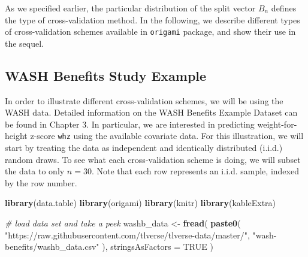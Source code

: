 \documentclass[12pt, krantz2,]{book}
\newenvironment{Shaded}{\begin{snugshade}}{\end{snugshade}}
\newcommand{\CommentTok}[1]{\textcolor[rgb]{0.56,0.35,0.01}{\textit{#1}}}
\newcommand{\DataTypeTok}[1]{\textcolor[rgb]{0.13,0.29,0.53}{#1}}
\newcommand{\KeywordTok}[1]{\textcolor[rgb]{0.13,0.29,0.53}{\textbf{#1}}}
\newcommand{\NormalTok}[1]{#1}
\newcommand{\OtherTok}[1]{\textcolor[rgb]{0.56,0.35,0.01}{#1}}
\newcommand{\StringTok}[1]{\textcolor[rgb]{0.31,0.60,0.02}{#1}}
\theoremstyle{definition}
\theoremstyle{definition}
\theoremstyle{definition}
\newcommand{\1}{\mathbbm{1}}
\begin{document}
As we specified earlier, the particular distribution of the split vector \(B_n\)
defines the type of cross-validation method. In the following, we describe
different types of cross-validation schemes available in \texttt{origami} package, and
show their use in the sequel.

\hypertarget{wash-benefits-study-example}{%
\subsection*{WASH Benefits Study Example}\label{wash-benefits-study-example}}


In order to illustrate different cross-validation schemes, we will be using the
WASH data. Detailed information on the WASH Benefits Example Dataset can be
found in \protect\hypertarget{data}{}{Chapter 3}. In particular, we are interested in predicting
weight-for-height z-score \texttt{whz} using the available covariate data. For this
illustration, we will start by treating the data as independent and identically
distributed (i.i.d.) random draws. To see what each cross-validation scheme is
doing, we will subset the data to only \(n=30\). Note that each row represents an
i.i.d. sample, indexed by the row number.

\begin{Shaded}
\begin{Highlighting}[]
\KeywordTok{library}\NormalTok{(data.table)}
\KeywordTok{library}\NormalTok{(origami)}
\KeywordTok{library}\NormalTok{(knitr)}
\KeywordTok{library}\NormalTok{(kableExtra)}

\CommentTok{# load data set and take a peek}
\NormalTok{washb_data <-}\StringTok{ }\KeywordTok{fread}\NormalTok{(}
  \KeywordTok{paste0}\NormalTok{(}
    \StringTok{"https://raw.githubusercontent.com/tlverse/tlverse-data/master/"}\NormalTok{,}
    \StringTok{"wash-benefits/washb_data.csv"}
\NormalTok{  ),}
  \DataTypeTok{stringsAsFactors =} \OtherTok{TRUE}
\NormalTok{)}
\end{Highlighting}
\end{Shaded}
\end{document}
